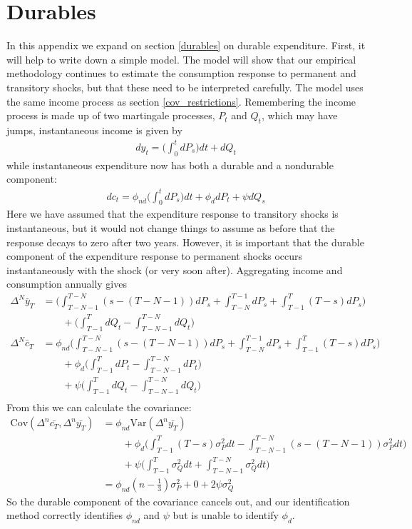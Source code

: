 \documentclass[titlepage]{\econtex}\newcommand{\texname}{ConsumptionHeterogeneity}
\begin{document}
	\section{Durables}\label{durables_appendix}
	In this appendix we expand on section \ref{durables} on durable expenditure. First, it will help to write down a simple model. The model will show that our empirical methodology continues to estimate the consumption response to permanent and transitory shocks, but that these need to be interpreted carefully. The model uses the same income process as section \ref{cov_restrictions}. Remembering the income process is made up of two martingale processes, $P_t$ and $Q_t$, which may have jumps, instantaneous income is given by
	\begin{align*}
	dy_t = \Big( \int_{0}^{t}dP_s \Big) dt  +dQ_t 
	\end{align*}
	while instantaneous expenditure now has both a durable and a nondurable component:
	\begin{align*}
	dc_t = \phi_{nd} \Big( \int_{0}^{t} dP_s  \Big) dt + \phi_{d} dP_t + \psi dQ_s
	\end{align*}
	Here we have assumed that the expenditure response to transitory shocks is instantaneous, but it would not change things to assume as before that the response decays to zero after two years. However, it is important that the durable component of the expenditure response to permanent shocks occurs instantaneously with the shock (or very soon after). Aggregating income and consumption annually gives
	\begin{align*}
	\Delta^N \bar{y}_T &=  \Big(\int_{T-N-1}^{T-N} (s-(T-N-1))dP_s  + \int_{T-N}^{T-1}dP_s + \int_{T-1}^{T} (T-s)dP_s \Big) \\
	& \qquad + \Big(\int_{T-1}^{T} dQ_t -\int_{T-N-1}^{T-N} dQ_t \Big) \\
	\Delta^N \bar{c}_T &= \phi_{nd} \Big(\int_{T-N-1}^{T-N} (s-(T-N-1))dP_s  + \int_{T-N}^{T-1}dP_s + \int_{T-1}^{T} (T-s)dP_s \Big) \\
	& \qquad + \phi_d \Big(\int_{T-1}^{T} dP_t -\int_{T-N-1}^{T-N} dP_t \Big) \\
	& \qquad + \psi \Big(\int_{T-1}^{T} dQ_t -\int_{T-N-1}^{T-N} dQ_t \Big) \\
	\end{align*}
	From this we can calculate the covariance:
	\begin{align*}
	\mathrm{Cov}(\Delta^n \bar{c_T},\Delta^n \bar{y_T} ) &= \phi_{nd} \mathrm{Var}(\Delta^n \bar{y_T}) \\
	& \qquad + \phi_d \Bigg( \int_{T-1}^{T} (T-s) \sigma_P^2 dt - \int_{T-N-1}^{T-N}(s-(T-N-1)) \sigma_P^2 dt \Bigg) \\
	& \qquad + \psi\Bigg(\int_{T-1}^{T}  \sigma_Q^2 dt + \int_{T-N-1}^{T-N}\sigma_Q^2 dt\Bigg) \\
	&= \phi_{nd} (n-\frac{1}{3})\sigma_P^2 + 0 +  2 \psi \sigma_Q^2
	\end{align*}
	So the durable component of the covariance cancels out, and our identification method correctly identifies $\phi_{nd}$ and $\psi$ but is unable to identify $\phi_d$.
	
\end{document}
